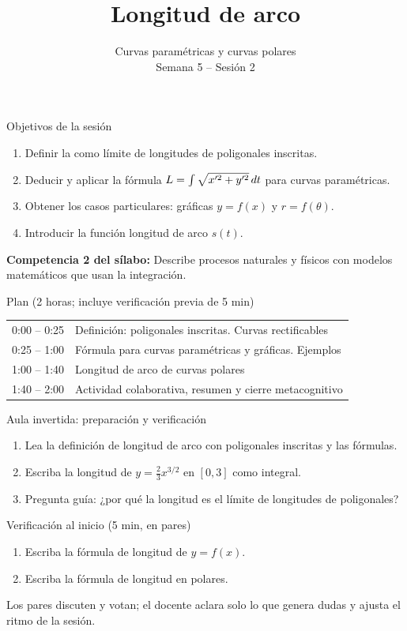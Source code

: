 \documentclass[10pt,aspectratio=169]{beamer}
\title[Longitud de arco]{Longitud de arco}
\subtitle{Curvas paramétricas y curvas polares\\[2pt]\small Semana 5 -- Sesión 2}
\begin{document}
\begin{frame}
  \titlepage
\end{frame}

\begin{frame}{Objetivos de la sesión}
  \begin{enumerate}
    \item Definir la  como límite de longitudes de poligonales inscritas.
    \item Deducir y aplicar la fórmula $L=\int\sqrt{x'^2+y'^2}\,dt$ para curvas paramétricas.
    \item Obtener los casos particulares: gráficas $y=f(x)$ y  $r=f(\theta)$.
    \item Introducir la función longitud de arco $s(t)$.
  \end{enumerate}
  \vspace{1mm}
  {\small\textbf{Competencia 2 del sílabo:} Describe procesos naturales y físicos con modelos matemáticos que usan la integración.}
  \begin{block}{Plan (2 horas; incluye verificación previa de 5 min)}
    \begin{tabular}{ll}
      0:00 -- 0:25 & Definición: poligonales inscritas. Curvas rectificables\\
      0:25 -- 1:00 & Fórmula para curvas paramétricas y gráficas. Ejemplos\\
      1:00 -- 1:40 & Longitud de arco de curvas polares\\
      1:40 -- 2:00 & Actividad colaborativa, resumen y cierre metacognitivo
    \end{tabular}
  \end{block}
\end{frame}

\begin{frame}{Aula invertida: preparación y verificación}
  \small
  \begin{previa}
    \begin{enumerate}
      \item Lea la definición de longitud de arco con poligonales inscritas y las fórmulas.
      \item Escriba la longitud de $y=\frac23x^{3/2}$ en $[0,3]$ como integral.
      \item Pregunta guía: ¿por qué la longitud es el límite de longitudes de poligonales?
    \end{enumerate}
  \end{previa}
  \begin{block}{Verificación al inicio (5 min, en pares)}
    \begin{enumerate}
      \item Escriba la fórmula de longitud de $y=f(x)$.
      \item Escriba la fórmula de longitud en polares.
    \end{enumerate}
    Los pares discuten y votan; el docente aclara solo lo que genera dudas y ajusta el ritmo de la sesión.
  \end{block}
\end{frame}
\end{document}
